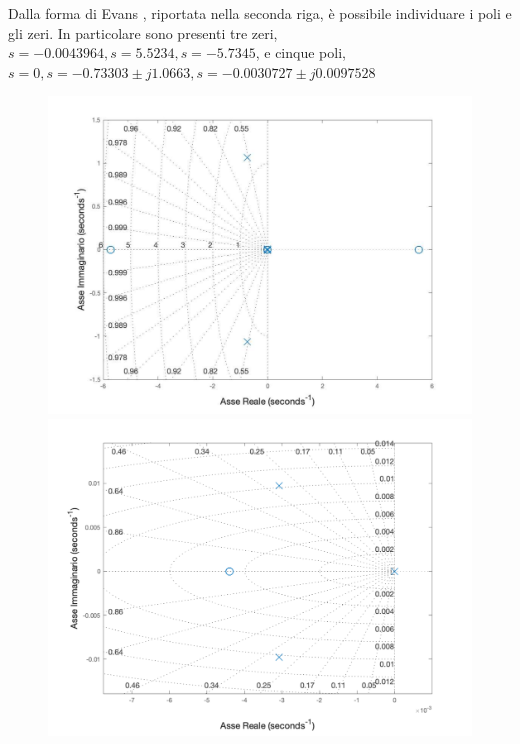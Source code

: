 Dalla forma di Evans \cite{zampieri_dispensa_controlli}, riportata nella seconda riga, è possibile individuare i poli e gli zeri. In particolare sono presenti tre zeri, $s = -0.0043964, s = 5.5234, s = - 5.7345$, e cinque poli, $s = 0, s = -0.73303 \pm j1.0663, s = -0.0030727 \pm j0.0097528$

\begin{figure}[H]
    \centering
    \begin{minipage}{.48\textwidth}
        \centering
        \includegraphics[width=1\linewidth]{Immagini/poli_longitudinali.pdf}
    \end{minipage}
    \hspace{0.02\textwidth}
    \begin{minipage}{.48\textwidth}
        \centering
        \includegraphics[width=1\linewidth]{Immagini/poli_longitudinali_detail.pdf}
    \end{minipage}
\end{figure}


